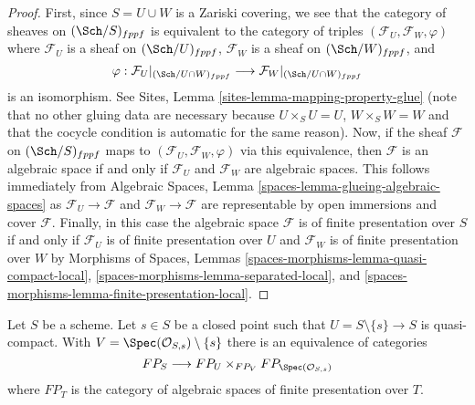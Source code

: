 \begin{proof}
First, since $S = U \cup W$ is a Zariski covering, we see that the
category of sheaves on $(\Sch/S)_{fppf}$ is equivalent to the category
of triples $(\mathcal{F}_U, \mathcal{F}_W, \varphi)$ where
$\mathcal{F}_U$ is a sheaf on $(\Sch/U)_{fppf}$,
$\mathcal{F}_W$ is a sheaf on $(\Sch/W)_{fppf}$, and
$$
\varphi :
\mathcal{F}_U|_{(\Sch/U \cap W)_{fppf}}
\longrightarrow
\mathcal{F}_W|_{(\Sch/U \cap W)_{fppf}}
$$
is an isomorphism. See Sites, Lemma \ref{sites-lemma-mapping-property-glue}
(note that no other gluing data are necessary because
$U \times_S U = U$, $W \times_S W = W$ and that the cocycle
condition is automatic for the same reason).
Now, if the sheaf $\mathcal{F}$ on $(\Sch/S)_{fppf}$
maps to $(\mathcal{F}_U, \mathcal{F}_W, \varphi)$
via this equivalence, then $\mathcal{F}$ is an algebraic space
if and only if $\mathcal{F}_U$ and $\mathcal{F}_W$ are algebraic spaces.
This follows immediately from
Algebraic Spaces, Lemma \ref{spaces-lemma-glueing-algebraic-spaces}
as $\mathcal{F}_U \to \mathcal{F}$ and $\mathcal{F}_W \to \mathcal{F}$
are representable by open immersions and cover $\mathcal{F}$.
Finally, in this case the algebraic space $\mathcal{F}$ is of finite
presentation over $S$ if and only if $\mathcal{F}_U$ is of finite presentation
over $U$ and $\mathcal{F}_W$ is of finite presentation over $W$
by Morphisms of Spaces, Lemmas
\ref{spaces-morphisms-lemma-quasi-compact-local},
\ref{spaces-morphisms-lemma-separated-local}, and
\ref{spaces-morphisms-lemma-finite-presentation-local}.
\end{proof}

\begin{lemma}
\label{lemma-glueing-near-closed-point}
Let $S$ be a scheme. Let $s \in S$ be a closed point such that
$U = S \setminus \{s\} \to S$ is quasi-compact. With
$V = \Spec(\mathcal{O}_{S, s}) \setminus \{s\}$ there is
an equivalence of categories
$$
FP_S \longrightarrow FP_U \times_{FP_V} FP_{\Spec(\mathcal{O}_{S, s})}
$$
where $FP_T$ is the category of algebraic spaces of finite presentation
over $T$.
\end{lemma}

